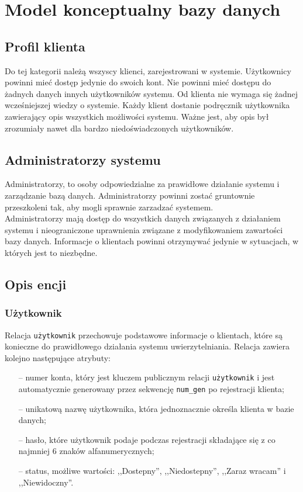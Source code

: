 \documentclass[a4paper,12pt]{article}
\begin{document}
\section[Model konceptualny bazy danych]{Model konceptualny bazy danych}
\subsection[Profil klienta]{Profil klienta}
Do tej kategorii należą wszyscy klienci, zarejestrowani w systemie.
Użytkownicy powinni mieć dostęp jedynie do swoich kont. Nie powinni
mieć dostępu do żadnych danych innych użytkowników systemu.
Od klienta nie wymaga się żadnej wcześniejszej wiedzy o systemie. Każdy klient dostanie
podręcznik użytkownika zawierający opis wszystkich możliwości systemu.
Ważne jest, aby opis był zrozumiały nawet dla bardzo niedoświadczonych użytkowników.

\subsection[Administratorzy systemu]{Administratorzy systemu}
Administratorzy, to osoby odpowiedzialne za prawidłowe działanie systemu i zarządzanie bazą danych.
Administratorzy powinni zostać gruntownie przeszkoleni tak, aby mogli sprawnie
zarzadzać systemem.\\
Administratorzy mają dostęp do wszystkich danych związanych z działaniem systemu i nieograniczone uprawnienia związane
z modyfikowaniem zawartości bazy danych.
Informacje o klientach powinni otrzymywać jedynie w sytuacjach, w których
jest to niezbędne.

\subsection[Opis encji]{Opis encji}
\subsubsection[Użytkownik]{Użytkownik}
Relacja \texttt{użytkownik} przechowuje podstawowe informacje o klientach, które są konieczne do prawidłowego działania systemu uwierzytelniania. Relacja zawiera kolejno następujące atrybuty:
\begin{itemize}
    \item[--] numer konta, który jest kluczem publicznym relacji \texttt{użytkownik} i jest automatycznie generowany przez sekwencję \texttt{num\_gen} po rejestracji klienta;
    \item[--] unikatową nazwę użytkownika, która jednoznacznie określa klienta w bazie danych;
    \item[--] hasło, które użytkownik podaje podczas rejestracji składające się z co najmniej 6 znaków alfanumerycznych;
    \item[--] status, możliwe wartości: ,,Dostepny'', ,,Niedostepny'', ,,Zaraz wracam'' i ,,Niewidoczny''.
\end{itemize}
\end{document}
